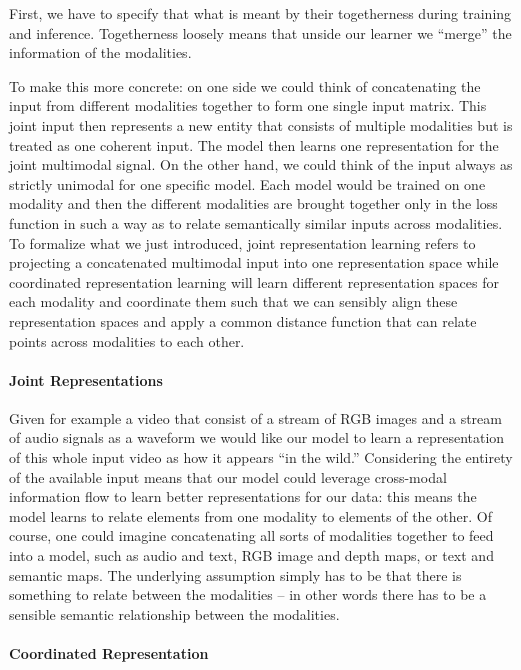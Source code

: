 \documentclass[
]{krantz}
\begin{document}
First, we have to specify that what is meant by their togetherness during training and inference. Togetherness loosely means that unside our learner we ``merge'' the information of the modalities.

To make this more concrete: on one side we could think of concatenating the input from different modalities together to form one single input matrix. This joint input then represents a new entity that consists of multiple modalities but is treated as one coherent input. The model then learns one representation for the joint multimodal signal. On the other hand, we could think of the input always as strictly unimodal for one specific model. Each model would be trained on one modality and then the different modalities are brought together only in the loss function in such a way as to relate semantically similar inputs across modalities. To formalize what we just introduced, joint representation learning refers to projecting a concatenated multimodal input into one representation space while coordinated representation learning will learn different representation spaces for each modality and coordinate them such that we can sensibly align these representation spaces and apply a common distance function that can relate points across modalities to each other.

\hypertarget{joint-representations}{%
\paragraph{Joint Representations}\label{joint-representations}}

Given for example a video that consist of a stream of RGB images and a stream of audio signals as a waveform we would like our model to learn a representation of this whole input video as how it appears ``in the wild.'' Considering the entirety of the available input means that our model could leverage cross-modal information flow to learn better representations for our data: this means the model learns to relate elements from one modality to elements of the other. Of course, one could imagine concatenating all sorts of modalities together to feed into a model, such as audio and text, RGB image and depth maps, or text and semantic maps. The underlying assumption simply has to be that there is something to relate between the modalities -- in other words there has to be a sensible semantic relationship between the modalities.

\hypertarget{coordinated-representation}{%
\paragraph{Coordinated Representation}\label{coordinated-representation}}
\end{document}
